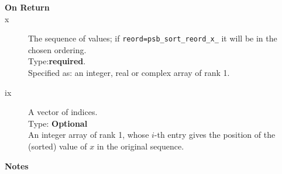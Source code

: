 \begin{description}
\item[\bf On Return]
\item[x] The sequence of values; if \verb|reord=psb_sort_reord_x_| it
  will be  in the chosen ordering.\\ 
Type:{\bf required}.\\
Specified as: an integer, real or complex array of rank 1.
\item[ix] A vector of indices.\\
Type: {\bf Optional} \\
An integer array of rank 1, whose $i$-th entry gives the position of
the (sorted) value of $x$ in the original sequence.
\end{description}

{\goodbreak\par\noindent\large\bfseries Notes}
